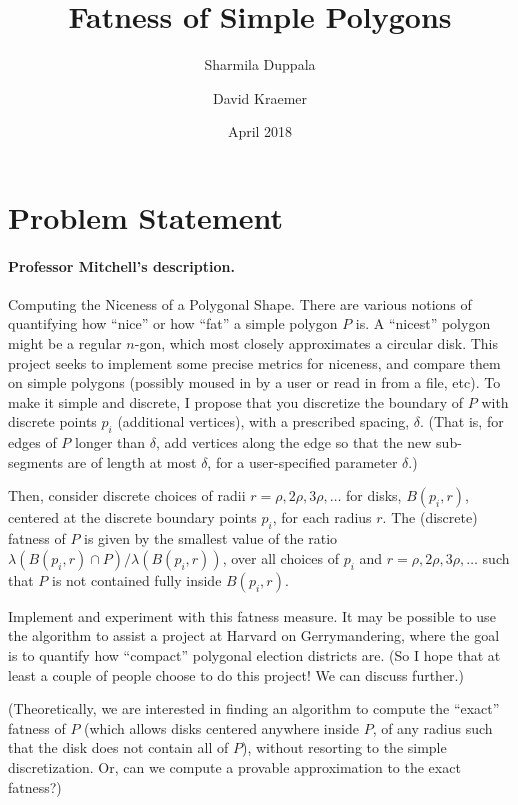 \documentclass[10pt]{article}
\title{Fatness of Simple Polygons}
\author{Sharmila Duppala \and David Kraemer}
\date{April 2018}
\theoremstyle{definition}
\begin{document}
\maketitle

\section{Problem Statement} 

\paragraph{Professor Mitchell's description.}
Computing the Niceness of a Polygonal Shape. There are various notions of
quantifying how “nice” or how “fat” a simple polygon $P$ is. A “nicest” polygon
might be a regular $n$-gon, which most closely approximates a circular disk. This
project seeks to implement some precise metrics for niceness, and compare them
on simple polygons (possibly moused in by a user or read in from a file, etc).
To make it simple and discrete, I propose that you discretize the boundary of
$P$ with discrete points $p_i$ (additional vertices), with a prescribed spacing,
$\delta$. (That is, for edges of $P$ longer than $\delta$, add vertices along
  the edge so that the new sub-segments are of length at most $\delta$, for a
user-specified parameter $\delta$.)

Then, consider discrete choices of radii $r = \rho, 2\rho, 3\rho, \ldots$ for
disks, $B(p_i,r)$, centered at the discrete boundary points $p_i$, for each
radius $r$. The (discrete) fatness of $P$ is given by the smallest value of the
ratio $\lambda (B(p_i,r)\cap P)/\lambda (B(p_i, r))$, over all choices of $p_i$
and $r = \rho, 2\rho, 3\rho, \ldots$ such that $P$ is not contained fully inside
$B(p_i,r)$.

  Implement and experiment with this fatness measure. It may be possible to use
  the algorithm to assist a project at Harvard on Gerrymandering, where the goal
  is to quantify how “compact” polygonal election districts are. (So I hope that
  at least a couple of people choose to do this project! We can discuss
further.)

(Theoretically, we are interested in finding an algorithm to compute the “exact”
  fatness of $P$ (which allows disks centered anywhere inside $P$, of any radius
  such that the disk does not contain all of $P$), without resorting to the
  simple discretization. Or, can we compute a provable approximation to the
exact fatness?)
\end{document}
